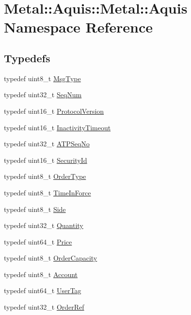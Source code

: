 \hypertarget{namespaceMetal_1_1Aquis_1_1Metal_1_1Aquis}{}\section{Metal\+:\+:Aquis\+:\+:Metal\+:\+:Aquis Namespace Reference}
\label{namespaceMetal_1_1Aquis_1_1Metal_1_1Aquis}
\subsection*{Typedefs}
\begin{DoxyCompactItemize}
\item 
typedef uint8\+\_\+t \hyperlink{namespaceMetal_1_1Aquis_1_1Metal_1_1Aquis_a0b0bc8746218801283c97b5d35fd6e4f}{Msg\+Type}
\item 
typedef uint32\+\_\+t \hyperlink{namespaceMetal_1_1Aquis_1_1Metal_1_1Aquis_ac83b513ab529b409a265f780dde53f09}{Seq\+Num}
\item 
typedef uint16\+\_\+t \hyperlink{namespaceMetal_1_1Aquis_1_1Metal_1_1Aquis_a9f1ca64a076b3596f33a83865a98d5d5}{Protocol\+Version}
\item 
typedef uint16\+\_\+t \hyperlink{namespaceMetal_1_1Aquis_1_1Metal_1_1Aquis_a88083d97c56dc56b91120850bfc4f1ff}{Inactivity\+Timeout}
\item 
typedef uint32\+\_\+t \hyperlink{namespaceMetal_1_1Aquis_1_1Metal_1_1Aquis_ac29f832d6f6eb2850aa9cda48a8c7ebd}{A\+T\+P\+Seq\+No}
\item 
typedef uint16\+\_\+t \hyperlink{namespaceMetal_1_1Aquis_1_1Metal_1_1Aquis_ab41c780dea2755091efbe61d172cf853}{Security\+Id}
\item 
typedef uint8\+\_\+t \hyperlink{namespaceMetal_1_1Aquis_1_1Metal_1_1Aquis_afaef58474c4d669863aaec28485956c5}{Order\+Type}
\item 
typedef uint8\+\_\+t \hyperlink{namespaceMetal_1_1Aquis_1_1Metal_1_1Aquis_a0a5d9b3f4cf0a7f0c25e70f465fa7247}{Time\+In\+Force}
\item 
typedef uint8\+\_\+t \hyperlink{namespaceMetal_1_1Aquis_1_1Metal_1_1Aquis_abcf9c0b065cc91cb825b5ca543f5269f}{Side}
\item 
typedef uint32\+\_\+t \hyperlink{namespaceMetal_1_1Aquis_1_1Metal_1_1Aquis_ae0487d1a46c3aa5e19f008a9fb48b2aa}{Quantity}
\item 
typedef uint64\+\_\+t \hyperlink{namespaceMetal_1_1Aquis_1_1Metal_1_1Aquis_a2a93fb1500b4bd5763e76ceda608e7cf}{Price}
\item 
typedef uint8\+\_\+t \hyperlink{namespaceMetal_1_1Aquis_1_1Metal_1_1Aquis_a12a3cc51893eada89aae3f8c240c3629}{Order\+Capacity}
\item 
typedef uint8\+\_\+t \hyperlink{namespaceMetal_1_1Aquis_1_1Metal_1_1Aquis_a810e6dd810307f6e1bda046f5d7e7096}{Account}
\item 
typedef uint64\+\_\+t \hyperlink{namespaceMetal_1_1Aquis_1_1Metal_1_1Aquis_ad25344ca11854eeda76562af3222157d}{User\+Tag}
\item 
typedef uint32\+\_\+t \hyperlink{namespaceMetal_1_1Aquis_1_1Metal_1_1Aquis_aa74d4cb1f6ac6d2a72ad750671f77613}{Order\+Ref}
\end{DoxyCompactItemize}



